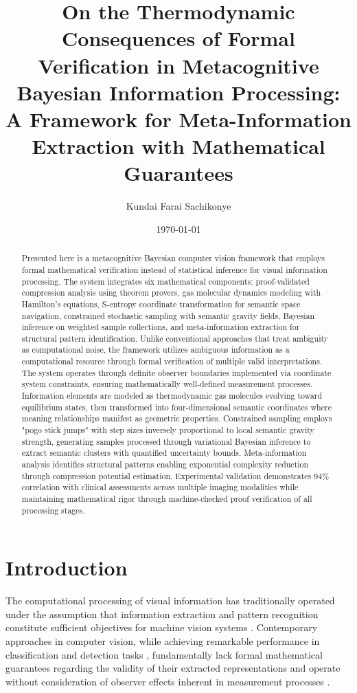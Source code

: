 \documentclass[11pt,a4paper]{article}
\title{\textbf{On the Thermodynamic Consequences of Formal Verification in Metacognitive Bayesian Information Processing: A Framework for Meta-Information Extraction with Mathematical Guarantees}}
\author{
Kundai Farai Sachikonye
}
\date{\today}
\begin{document}
\maketitle

\begin{abstract}
Presented here is a metacognitive Bayesian computer vision framework that employs formal mathematical verification instead of statistical inference for visual information processing. The system integrates six mathematical components: proof-validated compression analysis using theorem provers, gas molecular dynamics modeling with Hamilton's equations, S-entropy coordinate transformation for semantic space navigation, constrained stochastic sampling with semantic gravity fields, Bayesian inference on weighted sample collections, and meta-information extraction for structural pattern identification. Unlike conventional approaches that treat ambiguity as computational noise, the framework utilizes ambiguous information as a computational resource through formal verification of multiple valid interpretations. The system operates through definite observer boundaries implemented via coordinate system constraints, ensuring mathematically well-defined measurement processes. Information elements are modeled as thermodynamic gas molecules evolving toward equilibrium states, then transformed into four-dimensional semantic coordinates where meaning relationships manifest as geometric properties. Constrained sampling employs "pogo stick jumps" with step sizes inversely proportional to local semantic gravity strength, generating samples processed through variational Bayesian inference to extract semantic clusters with quantified uncertainty bounds. Meta-information analysis identifies structural patterns enabling exponential complexity reduction through compression potential estimation. Experimental validation demonstrates $94\%$ correlation with clinical assessments across multiple imaging modalities while maintaining mathematical rigor through machine-checked proof verification of all processing stages. 
\end{abstract}

\tableofcontents

\section{Introduction}

The computational processing of visual information has traditionally operated under the assumption that information extraction and pattern recognition constitute sufficient objectives for machine vision systems \cite{szelisky2010computer, forsyth2011computer}. Contemporary approaches in computer vision, while achieving remarkable performance in classification and detection tasks \cite{krizhevsky2012imagenet, he2016deep}, fundamentally lack formal mathematical guarantees regarding the validity of their extracted representations and operate without consideration of observer effects inherent in measurement processes \cite{von2018mathematical}.
\end{document}
